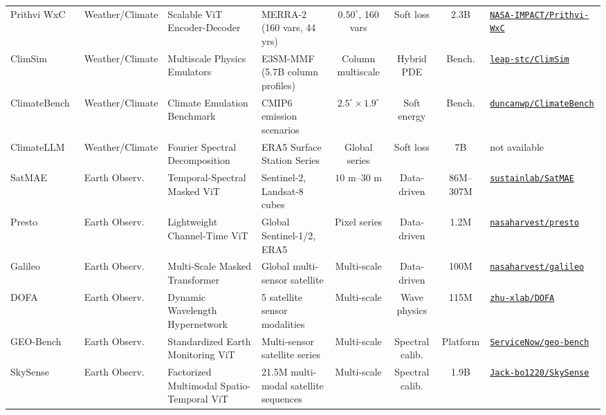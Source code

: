 \begin{table}[t]
{\begin{tabular}{@{}lp{2.0cm}p{3.0cm}p{3.4cm}cccp{3.0cm}@{}}
Prithvi WxC~\cite{schmude2024prithviwxc} & Weather/Climate & Scalable ViT Encoder-Decoder & MERRA-2 (160 vars, 44 yrs) & $0.50^\circ$, 160 vars & Soft loss & 2.3B & \href{https://github.com/NASA-IMPACT/Prithvi-WxC}{\texttt{NASA-IMPACT/Prithvi-WxC}} \\
ClimSim~\cite{yu2023climsim} & Weather/Climate & Multiscale Physics Emulators & E3SM-MMF (5.7B column profiles) & Column multiscale & Hybrid PDE & Bench. & \href{https://github.com/leap-stc/ClimSim}{\texttt{leap-stc/ClimSim}} \\
ClimateBench~\cite{watsonparris2022climatebench} & Weather/Climate & Climate Emulation Benchmark & CMIP6 emission scenarios & $2.5^\circ \times 1.9^\circ$ & Soft energy & Bench. & \href{https://github.com/duncanwp/ClimateBench}{\texttt{duncanwp/ClimateBench}} \\
ClimateLLM~\cite{li2025climatellm} & Weather/Climate & Fourier Spectral Decomposition & ERA5 Surface Station Series & Global series & Soft loss & 7B & not available \\
SatMAE~\cite{cong2022satmae} & Earth Observ. & Temporal-Spectral Masked ViT & Sentinel-2, Landsat-8 cubes & $10\text{ m}$--$30\text{ m}$ & Data-driven & 86M--307M & \href{https://github.com/sustainlab-group/SatMAE}{\texttt{sustainlab/SatMAE}} \\
Presto~\cite{tseng2023presto} & Earth Observ. & Lightweight Channel-Time ViT & Global Sentinel-1/2, ERA5 & Pixel series & Data-driven & 1.2M & \href{https://github.com/nasaharvest/presto}{\texttt{nasaharvest/presto}} \\
Galileo~\cite{tseng2025galileo} & Earth Observ. & Multi-Scale Masked Transformer & Global multi-sensor satellite & Multi-scale & Data-driven & 100M & \href{https://github.com/nasaharvest/galileo}{\texttt{nasaharvest/galileo}} \\
DOFA~\cite{xiong2024dofa} & Earth Observ. & Dynamic Wavelength Hypernetwork & 5 satellite sensor modalities & Multi-scale & Wave physics & 115M & \href{https://github.com/zhu-xlab/DOFA}{\texttt{zhu-xlab/DOFA}} \\
GEO-Bench~\cite{lacoste2023geobench} & Earth Observ. & Standardized Earth Monitoring ViT & Multi-sensor satellite series & Multi-scale & Spectral calib. & Platform & \href{https://github.com/ServiceNow/geo-bench}{\texttt{ServiceNow/geo-bench}} \\
SkySense~\cite{guo2024skysense} & Earth Observ. & Factorized Multimodal Spatio-Temporal ViT & 21.5M multi-modal satellite sequences & Multi-scale & Spectral calib. & 1.9B & \href{https://github.com/Jack-bo1220/SkySense}{\texttt{Jack-bo1220/SkySense}} \\

\end{tabular}}
\end{table}
